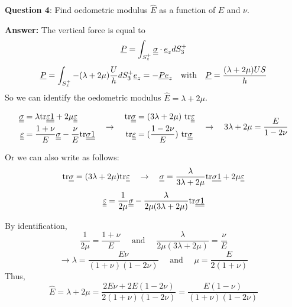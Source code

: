 \noindent \textbf{Question 4}: Find oedometric  modulus $\hat{E}$ as a  function of $E$ and $\nu$.

\textbf{Answer:} The vertical force is equal to 
\begin{equation}
\underline{P} = \int_{S_z^+} \underline{\underline{\sigma}} \cdot \underline{e}_z dS_3^+
\end{equation}
\begin{equation}
\underline{P} = \int_{S_z^+} - (\lambda + 2\mu)\frac{U}{h} dS_3^+ \underline{e}_z = -\underline{P} \underline{e}_z \quad \text{with} \quad \underline{P} = \frac{(\lambda+2\mu)US}{h} 
\end{equation}
So we can identify the oedometric modulus $\hat{E} = \lambda + 2\mu$.

\begin{equation}
\begin{split}
 \underline{\underline{\sigma}} &= \lambda \text{tr} \underline{\underline{\varepsilon}} \underline{\underline{1}} + 2 \mu \underline{\underline{\varepsilon}} \\
 \underline{\underline{\varepsilon}} &= \frac{1+\nu}{E} \underline{\underline{\sigma}} - \frac{\nu}{E} \text{tr} \underline{\underline{\sigma}} \underline{\underline{1}}
\end{split} \quad \rightarrow \quad  
\begin{split}
\text{tr} \underline{\underline{\sigma}} &= (3\lambda + 2\mu) \text{  tr} \underline{\underline{\varepsilon}} \\
\text{tr} \underline{\underline{\varepsilon}} &= (\frac{1-2\nu}{E}) \text{  tr} \underline{\underline{\sigma}} \\
\end{split} \quad \rightarrow \quad 3\lambda + 2\mu = \frac{E}{1-2\nu}
\end{equation}

Or we can also write as follows:
\begin{equation}
\text{tr} \underline{\underline{\sigma}} = (3\lambda + 2\mu) \text{tr} \underline{\underline{\varepsilon}} \quad \rightarrow \quad \underline{\underline{\sigma}} = \frac{\lambda}{3\lambda + 2\mu} \text{tr} \underline{\underline{\sigma}} \underline{\underline{1}} + 2\mu \underline{\underline{\varepsilon}}
\end{equation}
\begin{equation}
\underline{\underline{\varepsilon}} = \frac{1}{2\mu} \underline{\underline{\sigma}} - \frac{\lambda}{2\mu (3\lambda + 2\mu)} \text{tr} \underline{\underline{\sigma}} \underline{\underline{1}}
\end{equation}

By identification, 
\begin{equation}
\frac{1}{2\mu} = \frac{1+\nu}{E} \quad  \text{     and     } \quad \frac{\lambda}{2\mu (3\lambda + 2\mu)} = \frac{\nu}{E}  
\end{equation}
\begin{equation}
\rightarrow \lambda = \frac{E \nu}{(1+\nu)(1-2\nu)} \quad  \text{     and     } \quad \mu = \frac{E}{2(1+\nu)}
\end{equation}
Thus, 
\begin{equation}
\hat{E} = \lambda + 2\mu = \frac{2 E\nu + 2E(1-2\nu)}{2(1+\nu)(1-2\nu)} = \frac{E(1-\nu)}{(1+\nu)(1-2\nu)}
\end{equation}
